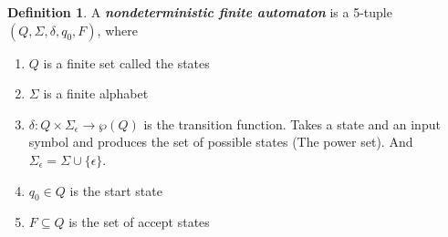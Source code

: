 \documentclass[11pt]{article}
\theoremstyle{definition}
\newtheorem{defn}{Definition}[section]
\begin{document}
\begin{defn}
A \textbf{\textit{nondeterministic finite automaton}} is a 5-tuple $(Q,\Sigma, \delta, q_0, F)$, where
\begin{enumerate}
    \item $Q$ is a finite set called the states 
    \item $\Sigma$ is a finite alphabet
    \item $\delta: Q\times\Sigma_\epsilon \longrightarrow \wp(Q)$ is the transition function. Takes a state and an input symbol and produces the set of possible states (The power set). And $\Sigma_\epsilon = \Sigma\cup\{\epsilon\}$.
    \item $q_0 \in Q$ is the start state
    \item $F\subseteq Q$ is the set of accept states
\end{enumerate}
\end{defn}
\end{document}
